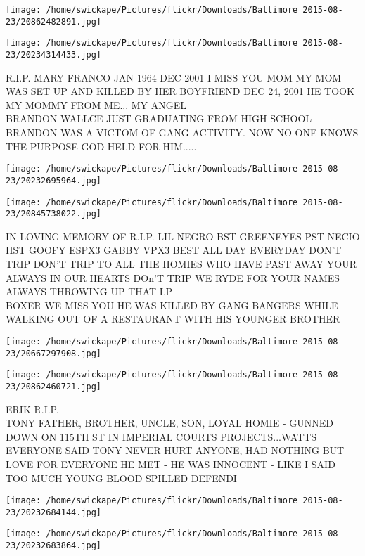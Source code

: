 \documentclass[10pt,letterpaper]{article}
\begin{document}
\texttt{[image: /home/swickape/Pictures/flickr/Downloads/Baltimore 2015-08-23/20862482891.jpg]}

\vspace{0.25in}
\texttt{[image: /home/swickape/Pictures/flickr/Downloads/Baltimore 2015-08-23/20234314433.jpg]}

R.I.P. MARY FRANCO JAN 1964 DEC 2001 I MISS YOU MOM MY MOM WAS SET UP AND KILLED BY HER BOYFRIEND DEC 24, 2001 HE TOOK MY MOMMY FROM ME... MY ANGEL\\
BRANDON WALLCE JUST GRADUATING FROM HIGH SCHOOL BRANDON WAS A VICTOM OF GANG ACTIVITY.  NOW NO ONE KNOWS THE PURPOSE GOD HELD FOR HIM.....
\pagebreak

\texttt{[image: /home/swickape/Pictures/flickr/Downloads/Baltimore 2015-08-23/20232695964.jpg]}

\vspace{0.25in}
\texttt{[image: /home/swickape/Pictures/flickr/Downloads/Baltimore 2015-08-23/20845738022.jpg]}

IN LOVING MEMORY OF R.I.P. LIL NEGRO BST GREENEYES PST NECIO HST GOOFY ESPX3 GABBY VPX3 BEST ALL DAY EVERYDAY DON'T TRIP DON'T TRIP TO ALL THE HOMIES WHO HAVE PAST AWAY YOUR ALWAYS IN OUR HEARTS DOn'T TRIP WE RYDE FOR YOUR NAMES ALWAYS THROWING UP THAT LP\\
BOXER WE MISS YOU HE WAS KILLED BY GANG BANGERS WHILE WALKING OUT OF A RESTAURANT WITH HIS YOUNGER BROTHER
\pagebreak

\texttt{[image: /home/swickape/Pictures/flickr/Downloads/Baltimore 2015-08-23/20667297908.jpg]}

\vspace{0.25in}
\texttt{[image: /home/swickape/Pictures/flickr/Downloads/Baltimore 2015-08-23/20862460721.jpg]}

ERIK R.I.P.\\
TONY FATHER, BROTHER, UNCLE, SON, LOYAL HOMIE {-} GUNNED DOWN ON 115TH ST IN IMPERIAL COURTS PROJECTS...WATTS EVERYONE SAID TONY NEVER HURT ANYONE, HAD NOTHING BUT LOVE FOR EVERYONE HE MET {-} HE WAS INNOCENT {-} LIKE I SAID TOO MUCH YOUNG BLOOD SPILLED DEFENDI
\pagebreak

\texttt{[image: /home/swickape/Pictures/flickr/Downloads/Baltimore 2015-08-23/20232684144.jpg]}

\vspace{0.25in}
\texttt{[image: /home/swickape/Pictures/flickr/Downloads/Baltimore 2015-08-23/20232683864.jpg]}
\end{document}
